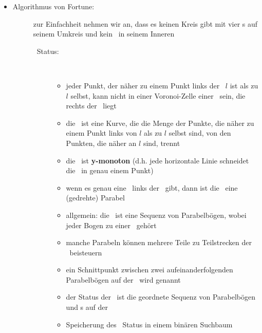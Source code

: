 \begin{itemize}
	\item \begin{description}
			\item[Algorithmus von Fortune:] zur Einfachheit nehmen wir an, dass es keinen Kreis gibt mit vier \site s auf seinem Umkreis und kein \site~in seinem Inneren \\\up
				\begin{description}
					\item[\sweep~Status:] \ \\\up
						\begin{itemize}
							\item jeder Punkt, der näher zu einem Punkt links der \sweep~$l$ ist als zu $l$ selbst, kann nicht in einer Voronoi-Zelle einer \site~sein, die rechts der \sweep~liegt
							\item die \textbf{\beach}~ist eine Kurve, die die Menge der Punkte, die näher zu einem Punkt links von $l$ als zu $l$ selbst sind, von den Punkten, die näher an $l$ sind, trennt
							\item die \beach~ist \textbf{y-monoton} (d.h. jede horizontale Linie schneidet die \beach~in genau einem Punkt)
							\item wenn es genau eine \site~links der \sweep~gibt, dann ist die \beach~eine (gedrehte) Parabel
							\item allgemein: die \beach~ist eine Sequenz von Parabelbögen, wobei jeder Bogen zu einer \site~gehört
							\item manche Parabeln können mehrere Teile zu Teilstrecken der \beach~beisteuern
							\item ein Schnittpunkt zwischen zwei aufeinanderfolgenden Parabelbögen auf der \beach~wird \textbf{\bpoint} genannt
							\item der Status der \sweep~ist die geordnete Sequenz von Parabelbögen und \bpoint s auf der \beach
							\item Speicherung des \sweep~Status in einem binären Suchbaum
						\end{itemize}
\end{description}
\end{description}
\end{itemize}
